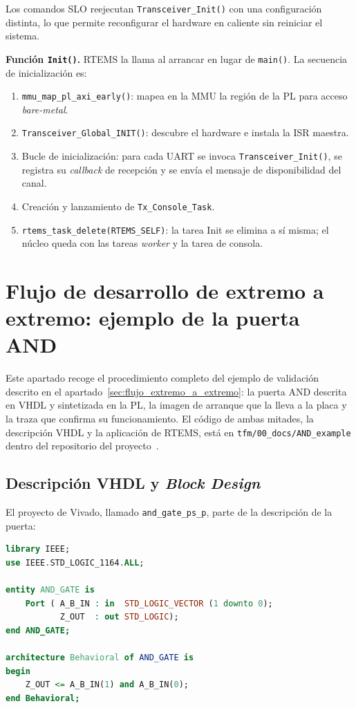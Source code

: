 Los comandos SLO reejecutan \texttt{Transceiver\_Init()} con una configuración distinta, lo que
permite reconfigurar el hardware en caliente sin reiniciar el sistema.

\textbf{Función \texttt{Init()}.} RTEMS la llama al arrancar en lugar de \texttt{main()}. La
secuencia de inicialización es:

\begin{enumerate}
    \item \texttt{mmu\_map\_pl\_axi\_early()}: mapea en la MMU la región de la PL para acceso
    \textit{bare-metal}.
    \item \texttt{Transceiver\_Global\_INIT()}: descubre el hardware e instala la ISR maestra.
    \item Bucle de inicialización: para cada UART se invoca \texttt{Transceiver\_Init()}, se
    registra su \textit{callback} de recepción y se envía el mensaje de disponibilidad del canal.
    \item Creación y lanzamiento de \texttt{Tx\_Console\_Task}.
    \item \texttt{rtems\_task\_delete(RTEMS\_SELF)}: la tarea Init se elimina a sí misma; el
    núcleo queda con las tareas \textit{worker} y la tarea de consola.
\end{enumerate}

\section{Flujo de desarrollo de extremo a extremo: ejemplo de la puerta AND} \label{anxC:flujo_and}

Este apartado recoge el procedimiento completo del ejemplo de validación descrito en el
apartado~\ref{sec:flujo_extremo_a_extremo}: la puerta AND descrita en VHDL y sintetizada en la PL,
la imagen de arranque que la lleva a la placa y la traza que confirma su funcionamiento. El
código de ambas mitades, la descripción VHDL y la aplicación de RTEMS, está en
\texttt{tfm/00\_docs/AND\_example} dentro del repositorio del proyecto~\cite{repo_tfm}.

\subsection{Descripción VHDL y \textit{Block Design}}

El proyecto de Vivado, llamado \texttt{and\_gate\_ps\_p}, parte de la descripción de la puerta:

\begin{lstlisting}[language=VHDL, caption={AND\_GATE.vhd}]
library IEEE;
use IEEE.STD_LOGIC_1164.ALL;

entity AND_GATE is
    Port ( A_B_IN : in  STD_LOGIC_VECTOR (1 downto 0);
           Z_OUT  : out STD_LOGIC);
end AND_GATE;

architecture Behavioral of AND_GATE is
begin
    Z_OUT <= A_B_IN(1) and A_B_IN(0);
end Behavioral;
\end{lstlisting}


